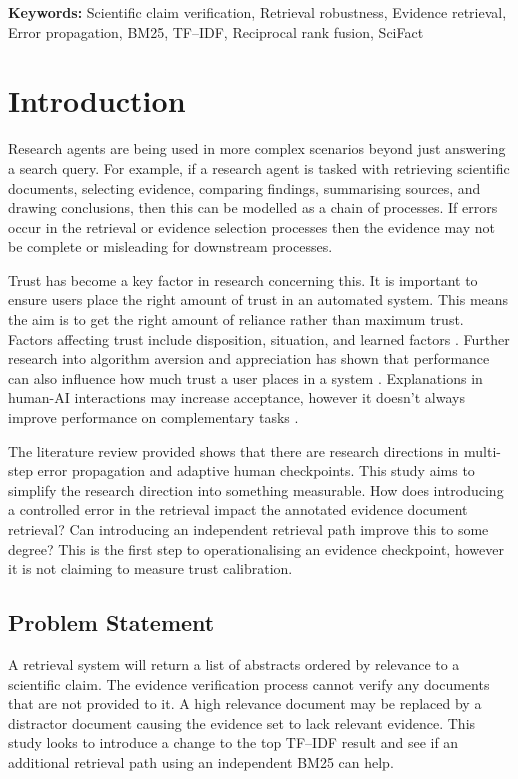 \documentclass[11pt,a4paper]{article}
\begin{document}
\textbf{Keywords:} Scientific claim verification, Retrieval robustness, Evidence retrieval, Error propagation, BM25, TF--IDF, Reciprocal rank fusion, SciFact

\section{Introduction}

Research agents are being used in more complex scenarios beyond just answering a search query. For example, if a research agent is tasked with retrieving scientific documents, selecting evidence, comparing findings, summarising sources, and drawing conclusions, then this can be modelled as a chain of processes. If errors occur in the retrieval or evidence selection processes then the evidence may not be complete or misleading for downstream processes.

Trust has become a key factor in research concerning this. It is important to ensure users place the right amount of trust in an automated system. This means the aim is to get the right amount of reliance \citep{lee2004} rather than maximum trust. Factors affecting trust include disposition, situation, and learned factors \citep{hoff2015}. Further research into algorithm aversion and appreciation has shown that performance can also influence how much trust a user places in a system \citep{dietvorst2015,logg2019}. Explanations in human-AI interactions may increase acceptance, however it doesn't always improve performance on complementary tasks \citep{bansal2021}.

The literature review provided shows that there are research directions in multi-step error propagation and adaptive human checkpoints. This study aims to simplify the research direction into something measurable. How does introducing a controlled error in the retrieval impact the annotated evidence document retrieval? Can introducing an independent retrieval path improve this to some degree? This is the first step to operationalising an evidence checkpoint, however it is not claiming to measure trust calibration.

\subsection{Problem Statement}

A retrieval system will return a list of abstracts ordered by relevance to a scientific claim. The evidence verification process cannot verify any documents that are not provided to it. A high relevance document may be replaced by a distractor document causing the evidence set to lack relevant evidence. This study looks to introduce a change to the top TF--IDF result and see if an additional retrieval path using an independent BM25 can help.
\end{document}
